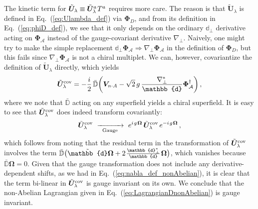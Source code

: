 \documentclass[12pt,document,nofootinbib,superscriptaddress,onecolumn,preprintnumbers,balancelastpage]{article}
\newcommand{\s}{\hspace{0.8pt}}
\newcommand{\PP}{\mathbb{d}}
\newcommand{\gauge}{\,\,\xrightarrow[\hspace{5pt}\text{Gauge}\hspace{5pt}]{}\,\,}
\DeclareRobustCommand{\Eq}[1]{Eq.~(\ref{#1})}
\newcommand{\bPhiD}{ \boldsymbol{\Phi}_D}
\newcommand{\bD}{ \boldsymbol{V}_{n \cdot A}}
\newcommand{\bPhialc}{ \boldsymbol{\Phi}_\alc}
\newcommand{\bU}{ \tilde{\boldsymbol U}}
\newcommand{\D}{\mathbb{D}}
\newcommand{\RCA}{\boldsymbol{\Omega}}
\newcommand{\alc}{\mathcal{A}}
\begin{document}
\begin{spacing}{1.2}
The kinetic term for $\bU_\lambda \equiv  \bU_\lambda^a\s T^a$ requires more care.
%
The reason is that $\bU_\lambda$ is defined in \Eq{eq:Ulambda_def} via $\bPhiD$, and from its definition in \Eq{eq:phiD_def}, we see that it only depends on the ordinary $\PP_\perp$ derivative acting on $\bPhialc$ instead of the gauge-covariant derivative $\nabla_\perp$.
%
Naively, one might try to make the simple replacement $\PP_\perp \bPhialc \Rightarrow \nabla_\perp \bPhialc$ in the definition of $\bPhiD$, but this fails since $\nabla_\perp \bPhialc$ is not a chiral multiplet.
%
We can, however, covariantize the definition of $\bU_\lambda$ directly, which yields
%
\begin{equation}
\label{eq:improvedUlambda}
\bU^{\rm cov}_\lambda  = -\frac{i}{2}\, \bar{\D} \bigg(\bD - \sqrt{2} \, g\, \frac{\nabla_\perp^*}{\PP} \bPhialc^\dagger \bigg)\,,
\end{equation}
%
where we note that $\bar{\D}$ acting on any superfield yields a chiral superfield.
%
It is easy to see that $\bU^{\rm cov}_\lambda$ does indeed transform covariantly:  
%
\begin{equation}
\bU^{\rm cov}_\lambda \gauge e^{i\s g\s \RCA}\, \bU^{\rm cov}_\lambda\, e^{-i\s g\s \RCA} \,,
\end{equation}
%
which follows from noting that the residual term in the transformation of $\bU^{\rm cov}_\lambda$ involves the term $\bar{\D} \big( \tilde{\PP} \RCA + 2\s \frac{\PP_\perp^*}{\PP}\s \RCA  \big)$, which vanishes because $\bar{\D} \RCA = 0$.
%
Given that the gauge transformation does not include any derivative-dependent shifts, as we had in \Eq{eq:nabla_def_nonAbelian}, it is clear that the term bi-linear in $\bU^{\rm cov}_\lambda$ is gauge invariant on its own.
%
We conclude that the non-Abelian Lagrangian given in \Eq{eq:LagrangianDnonAbelian} is gauge invariant.





\end{spacing}
\end{document}
